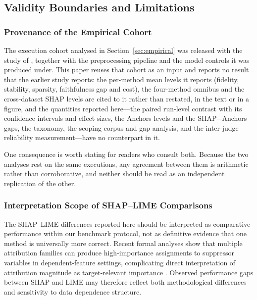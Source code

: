 \documentclass[10pt,a4paper,twoside]{article}
\begin{document}
\subsection{Validity Boundaries and Limitations}
\label{sec:validity}

\subsubsection{Provenance of the Empirical Cohort}
\label{sec:prior_publication}

The execution cohort analysed in Section~\ref{sec:empirical} was released
with the study of \citet{herrera2026framework}, together with the
preprocessing pipeline and the model controls it was produced under. This
paper reuses that cohort as an input and reports no result that the earlier
study reports: the per-method mean levels it reports (fidelity, stability,
sparsity, faithfulness gap and cost), the four-method omnibus and the
cross-dataset SHAP levels are cited to it rather than restated, in the text
or in a figure, and the quantities reported here---the paired run-level contrast
with its confidence intervals and effect sizes, the Anchors levels and the
SHAP$-$Anchors gaps, the taxonomy, the scoping corpus and gap analysis, and
the inter-judge reliability measurement---have no counterpart in it.

One consequence is worth stating for readers who consult both. Because the
two analyses rest on the same executions, any agreement between them is
arithmetic rather than corroborative, and neither should be read as an
independent replication of the other.

\subsubsection{Interpretation Scope of SHAP--LIME Comparisons}
\label{sec:interpretation_scope}

The SHAP--LIME differences reported here should be interpreted as
comparative performance within our benchmark protocol, not as definitive
evidence that one method is universally more correct. Recent formal
analyses show that multiple attribution families can produce
high-importance assignments to suppressor variables in
dependent-feature settings, complicating direct interpretation of
attribution magnitude as target-relevant importance
\citep{wilming2022scrutinizing,wilming2023theoretical,haufe2026formalization}.
Observed performance gaps between SHAP and LIME may therefore reflect both
methodological differences and sensitivity to data dependence structure.
\end{document}
